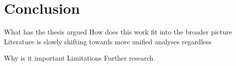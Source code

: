 \chapter{Conclusion}\label{c:Conclusion}
What has the thesis argued
How does this work fit into the broader picture
Literature is slowly shifting towards more unified analyses regardless

Why is it important 
Limitations
Further research

